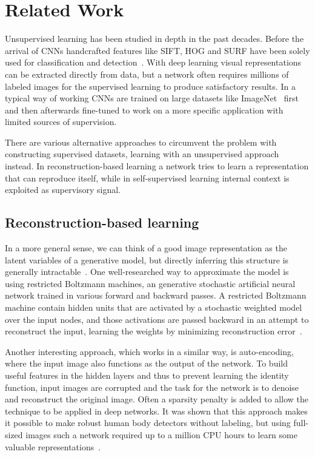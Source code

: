 %
\chapter{Related Work}
\label{ch:related_work}
Unsupervised learning has been studied in depth in the past decades. Before the arrival of CNNs handcrafted features like SIFT, HOG and SURF have been solely used for classification and detection~\cite{lee2017}. With deep learning visual representations can be extracted directly from data, but a network often requires millions of labeled images for the supervised learning to produce satisfactory results. In a typical way of working CNNs are trained on large datasets like ImageNet~\cite{deng2009} first and then afterwards fine-tuned to work on a more specific application with limited sources of supervision. 

There are various alternative approaches to circumvent the problem with constructing supervised datasets, learning with an unsupervised approach instead. In reconstruction-based learning a network tries to learn a representation that can reproduce itself, while in self-supervised learning internal context is exploited as supervisory signal.

\section{Reconstruction-based learning}
In a more general sense, we can think of a good image representation as the latent variables of a generative model, but directly inferring this structure is generally intractable~\cite{doersch2015}. One well-researched way to approximate the model is using restricted Boltzmann machines, an generative stochastic artificial neural network trained in various forward and backward passes. A restricted Boltzmann machine contain hidden units that are activated by a stochastic weighted model over the input nodes, and those activations are passed backward in an attempt to reconstruct the input, learning the weights by minimizing reconstruction error~\cite{smolensky1986}. 

Another interesting approach, which works in a similar way, is auto-encoding, where the input image also functions as the output of the network. To build useful features in the hidden layers and thus to prevent learning the identity function, input images are corrupted and the task for the network is to denoise and reconstruct the original image. Often a sparsity penalty is added to allow the technique to be applied in deep networks. It was shown that this approach makes it possible to make robust human body detectors without labeling, but using full-sized images such a network required up to a million CPU hours to learn some valuable representations~\cite{le2013}.  

